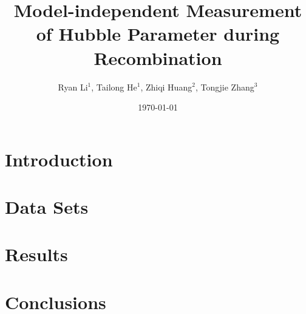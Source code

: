 \documentclass[10pt,prd,twocolumn]{revtex4-1}
\begin{document}
\title{Model-independent Measurement of Hubble Parameter during Recombination}
\author{Ryan Li$^1$, Tailong He$^1$, Zhiqi Huang$^{2}$, Tongjie Zhang$^3$}
\date{\today}
\begin{abstract}

\end{abstract}
\maketitle

\section{Introduction \label{sec:intro}}

\section{Data Sets \label{sec:data}}
\section{Results \label{sec:res}}
\section{Conclusions \label{sec:conc}}
\end{document}

